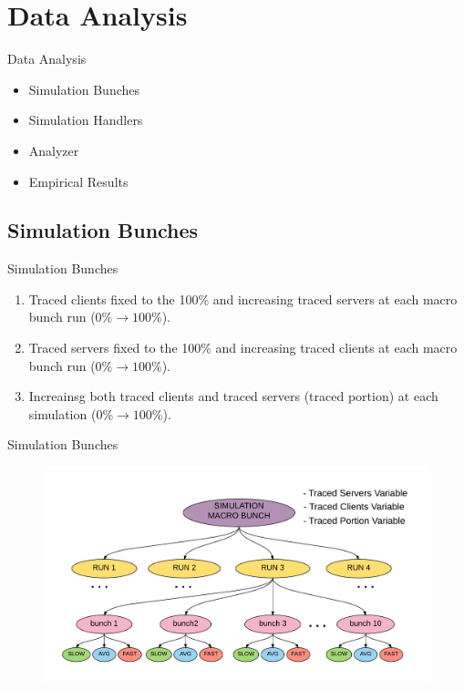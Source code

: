 \section{Data Analysis}

\begin{frame}{Data Analysis}{}
	\begin{itemize}
		\item {Simulation Bunches}
		\item {Simulation Handlers}
		\item {Analyzer}
		\item {Empirical Results}
	\end{itemize}
		

\end{frame}

\subsection{Simulation Bunches}	
	\begin{frame}{Simulation Bunches}
		
		\begin{enumerate}
			\item Traced clients fixed to the 100\% and increasing
traced servers at each macro bunch run ($ 0\% \rightarrow 100\% $).
			\item Traced servers fixed to the 100\% and increasing
traced clients at each macro bunch run ($ 0\% \rightarrow 100\% $).
			\item Increainsg both traced clients and traced servers (traced
		 portion) at each simulation ($ 0\% \rightarrow 100\% $).
		\end{enumerate}

	\end{frame}
	\begin{frame}{Simulation Bunches}
		\begin{figure}
			\centering
			\includegraphics[scale=0.45]{img/bunches.pdf}
		\end{figure}
	\end{frame}	

